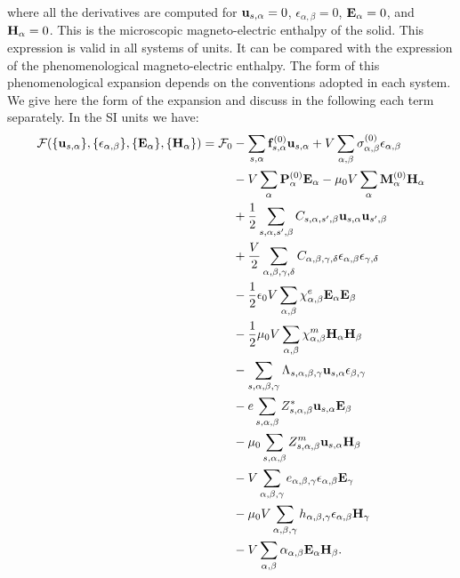 \documentclass[12pt,a4paper]{article}
\begin{document}
where all the derivatives are computed for ${\bf u}_{s,\alpha}=0$,
$\epsilon_{\alpha,\beta}=0$, ${\bf E}_\alpha=0$, and ${\bf H}_\alpha=0$.
\newpage
This is the microscopic magneto-electric enthalpy of the solid. This 
expression is valid in all systems of units. It can be compared with 
the expression of the 
phenomenological magneto-electric enthalpy. The form of this phenomenological
expansion depends on the conventions adopted in each system. We give here the
form of the expansion and discuss in the following each term separately.
In the SI units we have:
\begin{align}
\mathcal{F}(\{{\bf u}_{s,\alpha}\}, \{\epsilon_{\alpha,\beta}\},
\{ {\bf E}_\alpha\}, \{{\bf H}_\alpha\})=\mathcal{F}_0 &-
\sum_{s,\alpha} {\bf f}^{(0)}_{s,\alpha} {\bf u}_{s,\alpha}+ 
V \sum_{\alpha,\beta}
\sigma^{(0)}_{\alpha,\beta} \epsilon_{\alpha,\beta} \nonumber \\ 
&- V \sum_{\alpha} {\bf P}^{(0)}_\alpha {\bf E}_\alpha - 
\mu_0 V \sum_{\alpha}
{\bf M}^{(0)}_\alpha {\bf H}_\alpha \nonumber \\
&+ {1\over 2}
\sum_{s,\alpha,s',\beta} C_{s,\alpha,s',\beta} {\bf u}_{s,\alpha}
{\bf u}_{s',\beta}\nonumber \\
&+ {V\over 2}\sum_{\alpha,\beta,\gamma,\delta} 
C_{\alpha,\beta,\gamma,\delta}  
\epsilon_{\alpha,\beta}
\epsilon_{\gamma,\delta} \nonumber \\
&- {1\over 2} \epsilon_0 V \sum_{\alpha,\beta} 
\chi^e_{\alpha,\beta}
{\bf E}_{\alpha}
{\bf E}_{\beta} \nonumber \\
&- {1\over 2} \mu_0 V \sum_{\alpha,\beta} 
\chi^m_{\alpha,\beta}
{\bf H}_{\alpha}
{\bf H}_{\beta} \nonumber \\
&- \sum_{s,\alpha,\beta,\gamma}
\Lambda_{s,\alpha,\beta,\gamma} {\bf u}_{s,\alpha}
\epsilon_{\beta,\gamma}\nonumber \\
&- e \sum_{s,\alpha,\beta} Z^*_{s,\alpha,\beta} 
{\bf u}_{s,\alpha} {\bf E}_{\beta} \nonumber \\
&- \mu_0 \sum_{s,\alpha,\beta} 
Z^m_{s,\alpha,\beta} {\bf u}_{s,\alpha}{\bf H}_{\beta} \nonumber \\
&- V \sum_{\alpha,\beta,\gamma} e_{\alpha,\beta,\gamma} 
\epsilon_{\alpha,\beta} {\bf E}_{\gamma} \nonumber \\
&- \mu_0 V \sum_{\alpha,\beta,\gamma}  h_{\alpha,\beta,\gamma} 
\epsilon_{\alpha,\beta} {\bf H}_{\gamma} \nonumber \\
&- V \sum_{\alpha,\beta} \alpha_{\alpha,\beta} {\bf E}_{\alpha}
{\bf H}_{\beta}.
\end{align}
\end{document}
